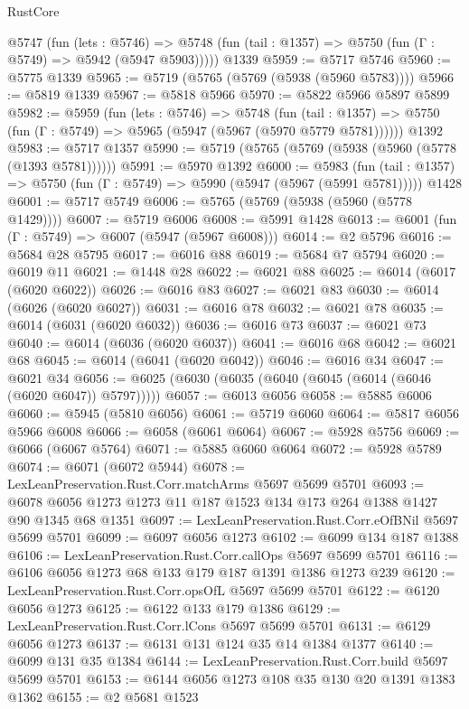 \begin{lexlean}{RustCore}
\begin{coremodule}
    @5747
      (fun (lets : @5746) =>
      @5748 (fun (tail : @1357) => @5750 (fun (Γ : @5749) => @5942 (@5947 @5903)))))
    @1339
@5959 := @5717 @5746
@5960 := @5775 @1339
@5965 := @5719 (@5765 (@5769 (@5938 (@5960 @5783))))
@5966 := @5819 @1339
@5967 := @5818 @5966
@5970 := @5822 @5966 @5897 @5899
@5982 := @5959
    (fun (lets : @5746) =>
    @5748
      (fun (tail : @1357) => @5750 (fun (Γ : @5749) => @5965 (@5947 (@5967 (@5970 @5779 @5781))))))
    @1392
@5983 := @5717 @1357
@5990 := @5719 (@5765 (@5769 (@5938 (@5960 (@5778 (@1393 @5781))))))
@5991 := @5970 @1392
@6000 := @5983
    (fun (tail : @1357) => @5750 (fun (Γ : @5749) => @5990 (@5947 (@5967 (@5991 @5781)))))
    @1428
@6001 := @5717 @5749
@6006 := @5765 (@5769 (@5938 (@5960 (@5778 @1429))))
@6007 := @5719 @6006
@6008 := @5991 @1428
@6013 := @6001 (fun (Γ : @5749) => @6007 (@5947 (@5967 @6008)))
@6014 := @2 @5796
@6016 := @5684 @28 @5795
@6017 := @6016 @88
@6019 := @5684 @7 @5794
@6020 := @6019 @11
@6021 := @1448 @28
@6022 := @6021 @88
@6025 := @6014 (@6017 (@6020 @6022))
@6026 := @6016 @83
@6027 := @6021 @83
@6030 := @6014 (@6026 (@6020 @6027))
@6031 := @6016 @78
@6032 := @6021 @78
@6035 := @6014 (@6031 (@6020 @6032))
@6036 := @6016 @73
@6037 := @6021 @73
@6040 := @6014 (@6036 (@6020 @6037))
@6041 := @6016 @68
@6042 := @6021 @68
@6045 := @6014 (@6041 (@6020 @6042))
@6046 := @6016 @34
@6047 := @6021 @34
@6056 := @6025 (@6030 (@6035 (@6040 (@6045 (@6014 (@6046 (@6020 @6047)) @5797)))))
@6057 := @6013 @6056
@6058 := @5885 @6006
@6060 := @5945 (@5810 @6056)
@6061 := @5719 @6060
@6064 := @5817 @6056 @5966 @6008
@6066 := @6058 (@6061 @6064)
@6067 := @5928 @5756
@6069 := @6066 (@6067 @5764)
@6071 := @5885 @6060 @6064
@6072 := @5928 @5789
@6074 := @6071 (@6072 @5944)
@6078 := LexLeanPreservation.Rust.Corr.matchArms @5697 @5699 @5701
@6093 := @6078 @6056 @1273 @1273 @11 @187 @1523 @134 @173 @264 @1388 @1427 @90 @1345 @68 @1351
@6097 := LexLeanPreservation.Rust.Corr.eOfBNil @5697 @5699 @5701
@6099 := @6097 @6056 @1273
@6102 := @6099 @134 @187 @1388
@6106 := LexLeanPreservation.Rust.Corr.callOps @5697 @5699 @5701
@6116 := @6106 @6056 @1273 @68 @133 @179 @187 @1391 @1386 @1273 @239
@6120 := LexLeanPreservation.Rust.Corr.opsOfL @5697 @5699 @5701
@6122 := @6120 @6056 @1273
@6125 := @6122 @133 @179 @1386
@6129 := LexLeanPreservation.Rust.Corr.lCons @5697 @5699 @5701
@6131 := @6129 @6056 @1273
@6137 := @6131 @131 @124 @35 @14 @1384 @1377
@6140 := @6099 @131 @35 @1384
@6144 := LexLeanPreservation.Rust.Corr.build @5697 @5699 @5701
@6153 := @6144 @6056 @1273 @108 @35 @130 @20 @1391 @1383 @1362
@6155 := @2 @5681 @1523

\end{coremodule}
\end{lexlean}
